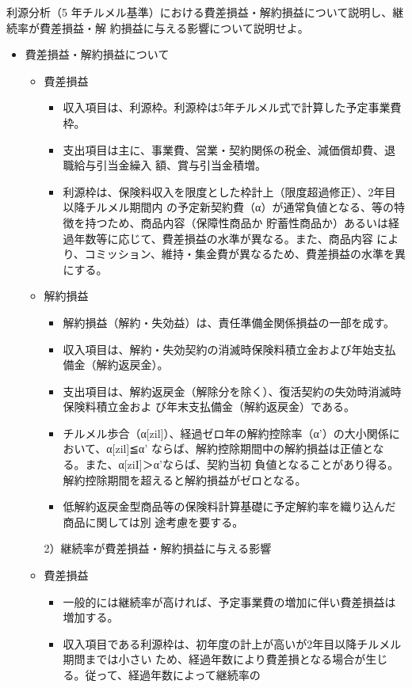 \documentclass[report,gutter=10mm,fore-edge=10mm,uplatex,dvipdfmx]{jlreq}
\begin{document}
利源分析（5 年チルメル基準）における費差損益・解約損益について説明し、継続率が費差損益・解
約損益に与える影響について説明せよ。
\answer{}
\begin{itemize}
\item[] 費差損益・解約損益について
\begin{itemize}
\item[] 費差損益
\begin{itemize}
\item[] 収入項目は、利源枠。利源枠は5年チルメル式で計算した予定事業費枠。
\item[] 支出項目は主に、事業費、営業・契約関係の税金、減価償却費、退職給与引当金繰入
額、賞与引当金積増。
\item[] 利源枠は、保険料収入を限度とした枠計上（限度超過修正）、2年目以降チルメル期間内
の予定新契約費（α）が通常負値となる、等の特徴を持つため、商品内容（保障性商品か
貯蓄性商品か）あるいは経過年数等に応じて、費差損益の水準が異なる。また、商品内容
により、コミッション、維持・集金費が異なるため、費差損益の水準を異にする。
\end{itemize}
\item[] 解約損益
\begin{itemize}
\item[] 解約損益（解約・失効益）は、責任準備金関係損益の一部を成す。
\item[] 収入項目は、解約・失効契約の消滅時保険料積立金および年始支払備金（解約返戻金）。
\item[] 支出項目は、解約返戻金（解除分を除く）、復活契約の失効時消滅時保険料積立金およ
び年末支払備金（解約返戻金）である。
\item[] チルメル歩合（α[zil]）、経過ゼロ年の解約控除率（α'）の大小関係において、α[zil]≦α'
ならば、解約控除期間中の解約損益は正値となる。また、α[ziI]＞α'ならば、契約当初
負値となることがあり得る。解約控除期間を超えると解約損益がゼロとなる。
\item[] 低解約返戻金型商品等の保険料計算基礎に予定解約率を織り込んだ商品に関しては別
途考慮を要する。
\end{itemize}
2）継続率が費差損益・解約損益に与える影響
\item[] 費差損益
\begin{itemize}
\item[] 一般的には継続率が高ければ、予定事業費の増加に伴い費差損益は増加する。
\item[] 収入項目である利源枠は、初年度の計上が高いが2年目以降チルメル期問までは小さい
ため、経過年数により費差損となる場合が生じる。従って、経過年数によって継続率の

\end{itemize}
\end{itemize}
\end{itemize}
\end{document}
